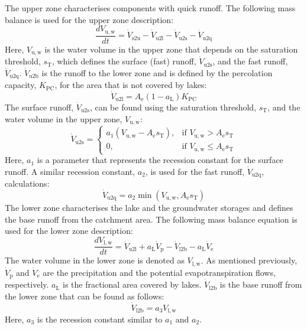 \documentclass[%
]{USN-PhD}
\begin{document}
The upper zone characterises components with quick runoff. The following mass balance is used for the upper zone description:
\begin{equation}\label{eq:eq28}
\frac{dV_\mathrm{u,w}}{dt}=\dot{V}_\mathrm{s2u}-\dot{V}_\mathrm{u2l}-\dot{V}_\mathrm{u2s}-\dot{V}_\mathrm{u2q}
\end{equation}
Here, $V_\mathrm{u,w}$ is the water volume in the upper zone that depends on the saturation threshold, $s_\mathrm{T}$, which defines the surface (fast) runoff, $\dot{V}_\mathrm{u2s}$, and the fast runoff, $\dot{V}_\mathrm{u2q}$. $\dot{V}_\mathrm{u2b}$ is the runoff to the lower zone and is defined by the percolation capacity, $K_\mathrm{PC}$, for the area that is not covered by lakes:
\begin{equation}\label{eq:eq29}
\dot{V}_\mathrm{u2l}=A_\mathrm{e}(1-a_\mathrm{L})K_\mathrm{PC}
\end{equation}
The surface runoff, $\dot{V}_\mathrm{u2s}$, can be found using the saturation threshold, $s_\mathrm{T}$, and the water volume in the upper zone, $V_\mathrm{u,w}$:
\begin{equation}\label{eq:eq30}
\dot{V}_\mathrm{u2s}=\begin{cases} a_1(V_\mathrm{u,w}-A_\mathrm{e}s_\mathrm{T}), & \mbox{if } V_\mathrm{u,w}>A_\mathrm{e}s_\mathrm{T}\\ 0, & \mbox{if } V_\mathrm{u,w}\leq A_\mathrm{e}s_\mathrm{T} \end{cases}
\end{equation}
Here, $a_1$ is a parameter that represents the recession constant for the surface runoff. A similar recession constant, $a_2$, is used for the fast runoff, $\dot{V}_\mathrm{u2q}$, calculations:
\begin{equation}\label{eq:eq31}
\dot{V}_\mathrm{u2q}=a_2\min{(V_\mathrm{u,w},A_\mathrm{e}s_\mathrm{T})}
\end{equation}
The lower zone characterises the lake and the groundwater storages and defines the base runoff from the catchment area. The following mass balance equation is used for the lower zone description:
\begin{equation}\label{eq:eq32}
\frac{dV_\mathrm{l,w}}{dt}=\dot{V}_\mathrm{u2l}+a_\mathrm{L}\dot{V}_\mathrm{p}-\dot{V}_\mathrm{l2b}-a_\mathrm{L}\dot{V}_\mathrm{e}
\end{equation}
The water volume in the lower zone is denoted as $V_\mathrm{l,w}$. As mentioned previously, $\dot{V}_\mathrm{p}$ and $\dot{V}_\mathrm{e}$ are the precipitation and the potential evapotranspiration flows, respectively. $a_\mathrm{L}$ is the fractional area covered by lakes. $\dot{V}_\mathrm{l2b}$ is the base runoff from the lower zone that can be found as follows:
\begin{equation}\label{eq:eq33}
\dot{V}_\mathrm{l2b}=a_3V_\mathrm{l,w}
\end{equation}
Here, $a_3$ is the recession constant similar to $a_1$ and $a_2$.
\end{document}

